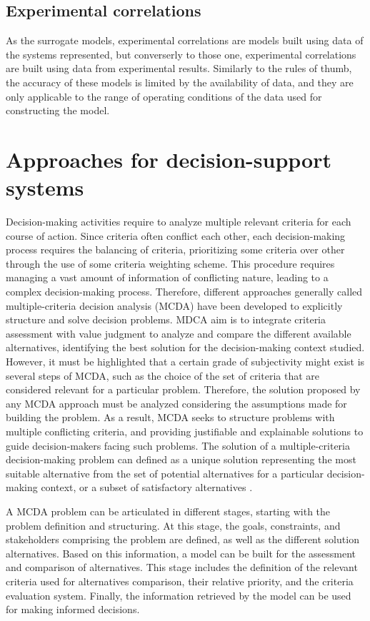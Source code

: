 \begin{refsection}[referencesCh1]
\subsection{Experimental correlations}
As the surrogate models, experimental correlations are models built using data of the systems represented, but converserly to those one, experimental correlations are built using data  from experimental results. Similarly to the rules of thumb, the accuracy of these models is limited by the availability of data, and they are only applicable to the range of operating conditions of the data used for constructing the model.

\section{Approaches for decision-support systems}
Decision-making activities require to analyze multiple relevant criteria for each course of action. Since criteria often conflict each other, each decision-making process requires the balancing of criteria, prioritizing some criteria over other through the use of some criteria weighting scheme. This procedure requires managing a vast amount of information of conflicting nature, leading to a complex decision-making process. Therefore, different approaches generally called multiple-criteria decision analysis (MCDA) have been developed to explicitly structure and solve decision problems. MDCA aim is to integrate criteria assessment with value judgment to analyze and compare the different available alternatives, identifying the best solution for the decision-making context studied. However, it must be highlighted that a certain grade of subjectivity might exist is several steps of MCDA, such as the choice of the set of criteria that are considered relevant for a particular problem. Therefore, the solution proposed by any MCDA approach must be analyzed considering the assumptions made for building the problem. As a result, MCDA seeks to structure problems with multiple conflicting criteria, and providing justifiable and explainable solutions to guide decision-makers facing such problems. The solution of a multiple-criteria decision-making problem can defined as a unique solution representing the most suitable alternative from the set of potential alternatives for a particular decision-making context, or a subset of satisfactory alternatives \citep{belton2002multiple}.

A MCDA problem can be articulated in different stages, starting with the problem definition and structuring. At this stage, the goals, constraints, and stakeholders comprising the problem are defined, as well as the different solution alternatives. Based on this information, a model can be built for the assessment and comparison of alternatives. This stage includes the definition of the relevant criteria used for alternatives comparison, their relative priority, and the criteria evaluation system. Finally, the information retrieved by the model can be used for making informed decisions. {\color{red}{figure?}}


\end{refsection}
